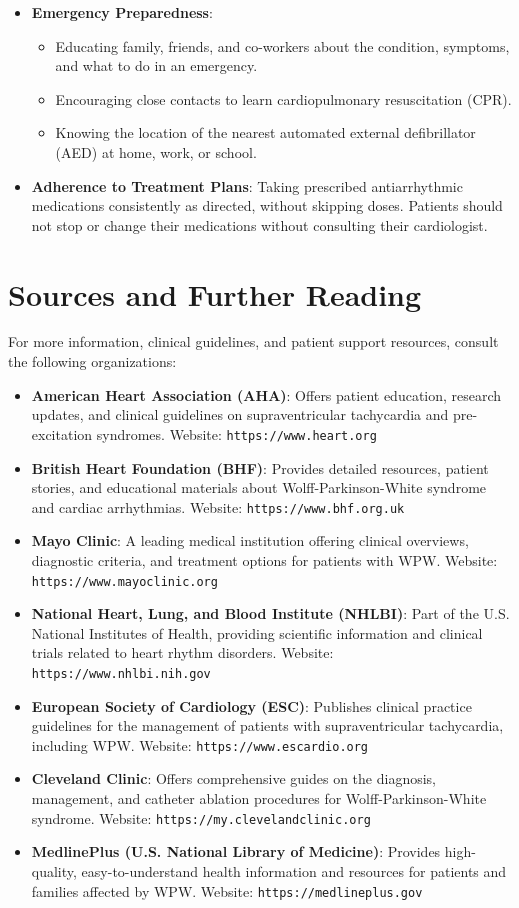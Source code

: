 \begin{itemize}
\begin{itemize}
    \end{itemize}
  \item \textbf{Emergency Preparedness}:
    \begin{itemize}
      \item Educating family, friends, and co-workers about the condition, symptoms, and what to do in an emergency.
      \item Encouraging close contacts to learn cardiopulmonary resuscitation (CPR).
      \item Knowing the location of the nearest automated external defibrillator (AED) at home, work, or school.
    \end{itemize}
  \item \textbf{Adherence to Treatment Plans}: Taking prescribed antiarrhythmic medications consistently as directed, without skipping doses. Patients should not stop or change their medications without consulting their cardiologist.
\end{itemize}

\section*{Sources and Further Reading}
For more information, clinical guidelines, and patient support resources, consult the following organizations:
\begin{itemize}
  \item \textbf{American Heart Association (AHA)}: Offers patient education, research updates, and clinical guidelines on supraventricular tachycardia and pre-excitation syndromes. Website: \texttt{https://www.heart.org}
  \item \textbf{British Heart Foundation (BHF)}: Provides detailed resources, patient stories, and educational materials about Wolff-Parkinson-White syndrome and cardiac arrhythmias. Website: \texttt{https://www.bhf.org.uk}
  \item \textbf{Mayo Clinic}: A leading medical institution offering clinical overviews, diagnostic criteria, and treatment options for patients with WPW. Website: \texttt{https://www.mayoclinic.org}
  \item \textbf{National Heart, Lung, and Blood Institute (NHLBI)}: Part of the U.S. National Institutes of Health, providing scientific information and clinical trials related to heart rhythm disorders. Website: \texttt{https://www.nhlbi.nih.gov}
  \item \textbf{European Society of Cardiology (ESC)}: Publishes clinical practice guidelines for the management of patients with supraventricular tachycardia, including WPW. Website: \texttt{https://www.escardio.org}
  \item \textbf{Cleveland Clinic}: Offers comprehensive guides on the diagnosis, management, and catheter ablation procedures for Wolff-Parkinson-White syndrome. Website: \texttt{https://my.clevelandclinic.org}
  \item \textbf{MedlinePlus (U.S. National Library of Medicine)}: Provides high-quality, easy-to-understand health information and resources for patients and families affected by WPW. Website: \texttt{https://medlineplus.gov}
\end{itemize}
